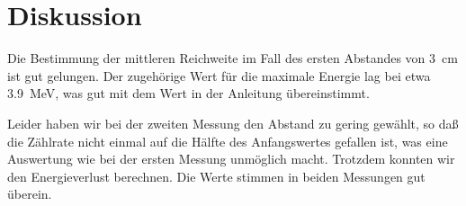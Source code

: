 
\section{Diskussion}

Die Bestimmung der mittleren Reichweite im Fall des ersten Abstandes von
\SI{3}{\centi\metre} ist gut gelungen. Der zugehörige Wert für die
maximale Energie lag bei etwa \SI{3.9}{\mega\electronvolt}, was gut mit
dem Wert in der Anleitung \parencite{v701} übereinstimmt.

Leider haben wir bei der zweiten Messung den Abstand zu gering gewählt,
so daß die Zählrate nicht einmal auf die Hälfte des Anfangswertes
gefallen ist, was eine Auswertung wie bei der ersten Messung unmöglich
macht. Trotzdem konnten wir den Energieverlust berechnen. Die Werte
stimmen in beiden Messungen gut überein.
